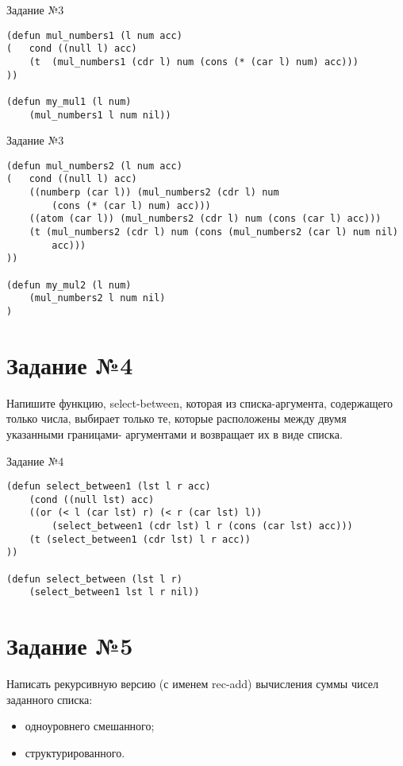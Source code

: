 \begin{code}
\caption{Задание №3}
\label{code:bf2}
\begin{verbatim}
(defun mul_numbers1 (l num acc)
(	cond ((null l) acc)
	(t  (mul_numbers1 (cdr l) num (cons (* (car l) num) acc)))
))

(defun my_mul1 (l num)
	(mul_numbers1 l num nil))
\end{verbatim}
\end{code}

\newpage

\begin{code}
\caption{Задание №3}
\label{code:bf2}
\begin{verbatim}
(defun mul_numbers2 (l num acc)
(	cond ((null l) acc)
	((numberp (car l)) (mul_numbers2 (cdr l) num 
		(cons (* (car l) num) acc)))
	((atom (car l)) (mul_numbers2 (cdr l) num (cons (car l) acc)))
	(t (mul_numbers2 (cdr l) num (cons (mul_numbers2 (car l) num nil) 
		acc)))
))

(defun my_mul2 (l num)
	(mul_numbers2 l num nil)
)
\end{verbatim}
\end{code}

\section{Задание №4}
Напишите функцию, select-between, которая из списка-аргумента, содержащего только числа, выбирает только те, которые расположены между двумя указанными границами- аргументами и возвращает их в виде списка.

\begin{code}
\caption{Задание №4}
\label{code:bf3}
\begin{verbatim}
(defun select_between1 (lst l r acc)
	(cond ((null lst) acc)
	((or (< l (car lst) r) (< r (car lst) l)) 
		(select_between1 (cdr lst) l r (cons (car lst) acc)))
	(t (select_between1 (cdr lst) l r acc))
))

(defun select_between (lst l r)
	(select_between1 lst l r nil))
\end{verbatim}
\end{code}

\section{Задание №5}
Написать рекурсивную версию (с именем rec-add) вычисления суммы чисел заданного списка:
\begin{itemize}
	\item одноуровнего смешанного;
	\item структурированного.
\end{itemize}

